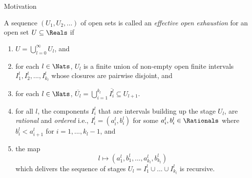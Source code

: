 \begin{frame}{Motivation}

    \begin{definition}
        \pause A sequence $(U_1, U_2, \ldots)$ of open sets is called an \textit{effective open exhaustion} for an open set $U\subseteq \Reals$ if 
        \pause \begin{enumerate}
                \item $ U = \bigcup_{l=0}^\infty U_l$, and
                \pause\item for each $l \in \Nats$,
                  $U_l$ is a finite union of non-empty open finite intervals $I_1^l, I_2^l,...,I_{k_l}^l $ whose closures are pairwise disjoint, and
                \pause\item for each $l \in \Nats$,
                   $\overline{U_l} = \bigcup_{i=1}^{k_l} \overline{I_i^l} \subseteq U_{l+1}$.
                \pause\item 
                for all $l$, the components $I_i^l$ that are intervals  building up the stage $U_l$, are \textit{rational} and \textit{ordered} i.e., $I_i^l = (a_i^l, b_i^l)$ for some $a_i^l, b_i^l \in \Rationals$ where $b_i^l < a_{i+1}^l$ for $i=1,...,k_l-1$, and
                \pause\item the map
                \[l\mapsto ( a_1^l , b_1^l, ...,
                 a_{k_l}^l, b_{k_l}^l) \]
                which delivers the sequence of stages $U_l = I_1^l\cup ...\cup I_{k_l}^l$ is recursive.
        \end{enumerate}
    \end{definition}
\end{frame}


